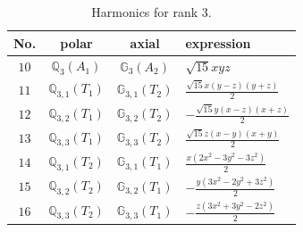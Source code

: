 \documentclass[fleqn,8pt,landscape]{jsarticle}
\begin{document}
\begin{table}[ht!]
\begin{center}
\caption{Harmonics for rank 3.}
\renewcommand{\arraystretch}{1.3}
\begin{tabular}{cccl} \hline \hline
No. & polar & axial & expression \\ \hline
$ 10 $ & $ \mathbb{Q}_{3}(A_{1}) $ & $ \mathbb{G}_{3}(A_{2}) $ & $ \sqrt{15} x y z $ \\
$ 11 $ & $ \mathbb{Q}_{3,1}(T_{1}) $ & $ \mathbb{G}_{3,1}(T_{2}) $ & $ \frac{\sqrt{15} x \left(y - z\right) \left(y + z\right)}{2} $ \\
$ 12 $ & $ \mathbb{Q}_{3,2}(T_{1}) $ & $ \mathbb{G}_{3,2}(T_{2}) $ & $ - \frac{\sqrt{15} y \left(x - z\right) \left(x + z\right)}{2} $ \\
$ 13 $ & $ \mathbb{Q}_{3,3}(T_{1}) $ & $ \mathbb{G}_{3,3}(T_{2}) $ & $ \frac{\sqrt{15} z \left(x - y\right) \left(x + y\right)}{2} $ \\
$ 14 $ & $ \mathbb{Q}_{3,1}(T_{2}) $ & $ \mathbb{G}_{3,1}(T_{1}) $ & $ \frac{x \left(2 x^{2} - 3 y^{2} - 3 z^{2}\right)}{2} $ \\
$ 15 $ & $ \mathbb{Q}_{3,2}(T_{2}) $ & $ \mathbb{G}_{3,2}(T_{1}) $ & $ - \frac{y \left(3 x^{2} - 2 y^{2} + 3 z^{2}\right)}{2} $ \\
$ 16 $ & $ \mathbb{Q}_{3,3}(T_{2}) $ & $ \mathbb{G}_{3,3}(T_{1}) $ & $ - \frac{z \left(3 x^{2} + 3 y^{2} - 2 z^{2}\right)}{2} $ \\
 \hline \hline
\end{tabular}
\end{center}
\end{table}
\end{document}
